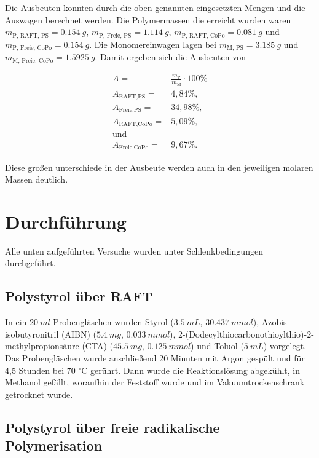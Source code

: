 \documentclass[10pt,a4paper,ngerman]{scrartcl}
\newcommand{\celsius}{^{\circ}\mathrm{C}}
\begin{document}
		Die Ausbeuten konnten durch die oben genannten eingesetzten Mengen und die Auswagen berechnet werden. Die Polymermassen die erreicht 
		wurden waren $m_\text{P, RAFT, PS} = \SI{0,154}{g}$, $m_\text{P, Freie, PS} = \SI{1,114}{g}$, $m_\text{P, RAFT, CoPo} = \SI{0,081}{g}$ und $m_\text{P, Freie, CoPo} = \SI{0,154}{g}$.
		Die Monomereinwagen lagen bei $m_\text{M, PS} = \SI{3,185}{g}$ und $m_\text{M, Freie, CoPo} = \SI{1,5925}{g}$. Damit ergeben sich die Ausbeuten von


			\begin{eqnarray}
				A =& \frac{m_\text{P}}{m_\text{M}}\cdot 100\%\\
				A_\text{RAFT,PS} =& 4,84\% \text{,}\\
				A_\text{Freie,PS} =& 34,98\% \text{,}\\
				A_\text{RAFT,CoPo} =& 5,09\% \text{,}\\
				\text{und} \\
				A_\text{Freie,CoPo} =& 9,67\%	\text{.}		
			\end{eqnarray}

		Diese großen unterschiede in der Ausbeute werden auch in den jeweiligen molaren Massen deutlich. 


\section{Durchführung}

	Alle unten aufgeführten Versuche wurden unter Schlenkbedingungen durchgeführt.
	
	\subsection{Polystyrol über RAFT}

		In ein $\SI{20}{ml}$ Probengläschen wurden Styrol ($\SI{3,5}{mL}$, $\SI{30,437}{mmol}$), Azobis-isobutyronitril (AIBN) ($\SI{5,4}{mg}$, $\SI{0,033}{mmol}$), 
		2-(Dodecylthiocarbonothioylthio)-2-methylpropionsäure (CTA) ($\SI{45,5}{mg}$, $\SI{0,125}{mmol}$) und Toluol ($\SI{5}{mL}$) vorgelegt. Das Probengläschen wurde 
		anschließend 20 Minuten mit Argon gespült und für 4,5 Stunden bei 70 $\celsius$ gerührt. Dann wurde die Reaktionslösung abgekühlt, in Methanol gefällt, 
		woraufhin der Feststoff  wurde und im Vakuumtrockenschrank getrocknet wurde.

	\subsection{Polystyrol über freie radikalische Polymerisation}
\end{document}

